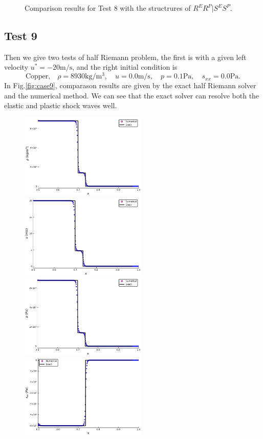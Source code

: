 \documentclass[review]{elsarticle}
\begin{document}
\begin{enumerate}[Step 1]
\begin{figure}
    \caption{Comparison results for Test 8 with the structrures of $R^ER^P|S^ES^P$.  }
  \label{fig:case8}
\end{figure}
\subsection{Test 9}
Then we give two tests of  half Riemann problem, the first is with a given left velocity $u^* = -20\text{m/s}$, and the right initial condition is
\begin{equation}
 \text{Copper,}\quad\rho = 8930\text{kg}/\text{m}^3, \quad  u = 0.0\text{m}/\text{s}, \quad  p =0.1\text{Pa}, \quad  s_{xx}=0.0\text{Pa}.
\end{equation}
In Fig.\ref{fig:case9}, comparason results are given by the exact half Riemann solver and the numerical method. We can see that the exact solver  can resolve both the elastic and plastic shock waves well.
\begin{figure}
  \centering
  \includegraphics[width= 6cm] {case10rho.pdf}
  \includegraphics[width= 6cm] {case10u.pdf}
  \includegraphics[width= 6cm] {case10p.pdf}
  \includegraphics[width= 6cm] {case10sxx.pdf}


\end{figure}
\end{enumerate}
\end{document}
